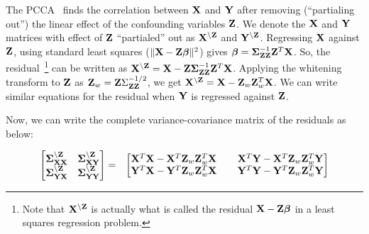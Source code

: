 \documentclass{llncs}
\newcommand{\X}{{\bf X}}
\newcommand{\Y}{{\bf Y}}
\newcommand{\Z}{{\bf Z}}
\newcommand{\bs}{\boldsymbol}
\newcommand{\bSigma}{\boldsymbol \Sigma}
\begin{document}
The PCCA~\cite{timm} finds the correlation between $\X$ and $\Y$ after removing (``partialing out'') the linear effect of the confounding variables $\Z$. 
We denote the $\X$ and $\Y$ matrices with effect of $\Z$ ``partialed'' out as $\X^{\backslash\Z}$ and $\Y^{\backslash\Z}$. Regressing $\X$ against $\Z$, using standard least squares ($\|\X -\Z\bs\beta\|^2$) gives $\bs\beta=  \bs\Sigma_{\Z\Z}^{-1}\Z^T\X$. So, the residual~\footnote{Note that $\X^{\backslash\Z}$ is actually what is called the residual $\X-\Z\bs\beta$ in a least squares regression problem.} can be written as  $\X^{\backslash\Z}=\X - \Z\bs\Sigma_{\Z\Z}^{-1}\Z^T\X$. Applying the whitening transform to $\Z$  as $\Z_w =\Z \Sigma_{\Z\Z}^{-1/2}$, we get $\X^{\backslash\Z}=\X - \Z_w\Z_w^T\X$.
We can write similar equations for the residual when $\Y$ is regressed against $\Z$.
 
Now, we can write the complete variance-covariance matrix of the residuals as below:

\begin{eqnarray}
\label{matrices}
\begin{bmatrix}
 \bs\Sigma_{\X\X}^{\backslash \Z} & \bs\Sigma_{\X\Y}^{\backslash \Z} \\
  \bs\Sigma_{\Y\X}^{\backslash \Z} & \bs\Sigma_{\Y\Y}^{\backslash \Z} 
\end{bmatrix}
&=&
\begin{bmatrix}
  \X^T\X -\X^T \Z_w\Z_w^T\X &\;\;\;\;   \X^T\Y -\X^T \Z_w\Z_w^T\Y\\
  \Y^T\X -\Y^T \Z_w\Z_w^T\X &\;\;\;\;   \Y^T\Y -\Y^T \Z_w\Z_w^T\Y
\end{bmatrix}
\end{eqnarray}



\end{document}
